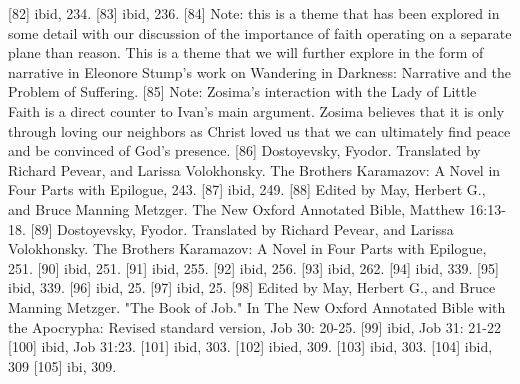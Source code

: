 [82] ibid, 234.
[83] ibid, 236.
[84] Note: this is a theme that has been explored in some detail with our discussion of the importance of faith operating on a separate plane than reason. This is a theme that we will further explore in the form of narrative in Eleonore Stump's work on Wandering in Darkness: Narrative and the Problem of Suffering.
[85] Note: Zosima’s interaction with the Lady of Little Faith is a direct counter to Ivan’s main argument. Zosima believes that it is only through loving our neighbors as Christ loved us that we can ultimately find peace and be convinced of God’s presence.
[86] Dostoyevsky, Fyodor. Translated by Richard Pevear, and Larissa Volokhonsky. The Brothers Karamazov: A Novel in Four Parts with Epilogue, 243.
[87] ibid, 249.
[88] Edited by May, Herbert G., and Bruce Manning Metzger. The New Oxford Annotated Bible, Matthew 16:13-18.
[89] Dostoyevsky, Fyodor. Translated by Richard Pevear, and Larissa Volokhonsky. The Brothers Karamazov: A Novel in Four Parts with Epilogue, 251.
[90] ibid, 251.
[91] ibid, 255.
[92] ibid, 256.
[93] ibid, 262.
[94] ibid, 339.
[95] ibid, 339.
[96] ibid, 25.
[97] ibid, 25.
[98] Edited by May, Herbert G., and Bruce Manning Metzger. "The Book of Job." In The New Oxford Annotated Bible with the Apocrypha: Revised standard version, Job 30: 20-25.
[99] ibid, Job 31: 21-22
[100] ibid, Job 31:23.
[101] ibid, 303.
[102] ibied, 309.
[103] ibid, 303.
[104] ibid, 309
[105] ibi, 309.
